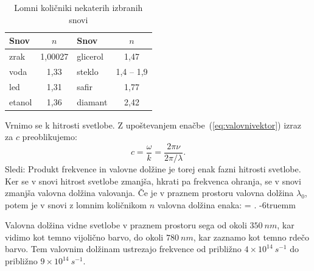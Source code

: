 \begin{table}[ht]
 \centering
 \small
\begin{tabular}{|l|c||l|c|} \hline  
      Snov & $n$ & Snov & $n$ \\ \hline
      zrak & 1,00027 & glicerol & 1,47\\ \hline
      voda & 1,33 & steklo & 1,4 -- 1,9\\ \hline 
      led & 1,31 & safir & 1,77\\ \hline
      etanol & 1,36 & diamant & 2,42\\ 
\hline 
\end{tabular}
  \caption{Lomni količniki nekaterih izbranih snovi}
\label{table:n}
\end{table}

Vrnimo se k hitrosti svetlobe. Z upoštevanjem enačbe~(\ref{eq:valovnivektor})
izraz za $c$ preoblikujemo:
\begin{equation}
 c = \frac{\omega}{k} = \frac{2 \pi \nu}{2 \pi/\lambda}.
 \label{eq:03_17}
\end{equation}
Sledi:
Produkt frekvence in valovne dolžine je torej enak fazni hitrosti svetlobe. Ker 
se v snovi hitrost svetlobe zmanjša, hkrati pa frekvenca ohranja, se 
v snovi zmanjša valovna dolžina valovanja. Če je v praznem prostoru valovna dolžina
$\lambda_0$, potem je v snovi z lomnim količnikom $n$ valovna dolžina enaka:
\beq
\lambda = .
\label{eq:03_18}
\eeq
\vglue-6truemm
\begin{remark}
Valovna dolžina vidne svetlobe v praznem prostoru sega od okoli $350~\si{nm}$, kar
vidimo kot temno vijolično barvo, do okoli $780~\si{nm}$, kar zaznamo kot temno rdečo 
barvo. Tem valovnim dolžinam ustrezajo frekvence od približno 
$4\times10^{14}~\si{s}^{-1}$ do približno $9\times10^{14}~\si{s}^{-1}$.
\end{remark}

